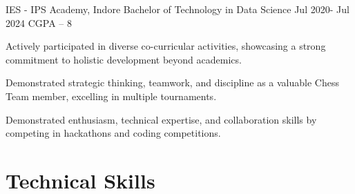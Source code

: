 \documentclass[letterpaper]{config}
\begin{document}
\EducationExperience
    {IES - IPS Academy, Indore} %
    {Bachelor of Technology in Data Science} %
    {Jul 2020- Jul 2024} %
    {CGPA – 8}
    {
        \item Actively participated in diverse co-curricular activities, showcasing a strong commitment to holistic development beyond academics.
        \item Demonstrated strategic thinking, teamwork, and discipline as a valuable Chess Team member, excelling in multiple tournaments.
        \item Demonstrated enthusiasm, technical expertise, and collaboration skills by competing in hackathons and coding competitions.
    } 



    
\section{Technical Skills}

\end{document}
